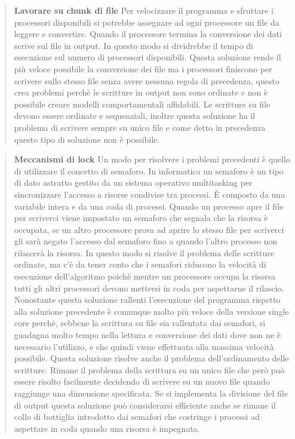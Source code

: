 \documentclass[../main.tex]{subfiles}
\begin{document}
\begin{verse}
\textbf{Lavorare su chunk di file}
Per velocizzare il programma e sfruttare i processori disponibili si potrebbe assegnare ad ogni processore un file da leggere e convertire. Quando il processore termina la conversione dei dati scrive sul file in output. In questo modo si dividrebbe il tempo di esecuzione sul numero di processori disponibili. 
Questa soluzione rende il più veloce possibile la conversione dei file ma i processori finiscono per scrivere sullo stesso file senza avere nessuna regola di precedenza, questo crea problemi perchè le scritture in output non sono ordinate e non è possibile creare modelli comportamentali affidabili. Le scritture su file devono essere ordinate e sequenziali, inoltre questa soluzione ha il problema di scrivere sempre su unico file e come detto in precedenza questo tipo di soluzione non è possibile.
\end{verse}

\begin{verse}
\textbf{Meccanismi di lock}
Un modo per risolvere i problemi precedenti è quello di utilizzare il concetto di semaforo. 
In informatica un semaforo è un tipo di dato astratto gestito da un sistema operativo multitasking per sincronizzare l'accesso a risorse condivise tra processi. È composto da una variabile intera e da una coda di processi. Quando un processo apre il file per scriverci viene impostato un semaforo che segnala che la risorsa è occupata, se un altro processore prova ad aprire lo stesso file per scriverci gli sarà negato l'accesso dal semaforo fino a quando l'altro processo non rilascerà la risorsa.
In questo modo si risolve il problema delle scritture ordinate, ma c'è da tener conto che i semafori riducono la velocità di esecuzione dell'algoritmo poichè mentre un processore occupa la risorsa tutti gli altri processori devono mettersi in coda per aspettarne il rilascio. Nonostante questa soluzione rallenti l'esecuzione del programma rispetto alla soluzione precedente è comunque molto più veloce della versione single core perchè, sebbene la scrittura su file sia rallentata dai semafori, si guadagna molto tempo nella lettura e conversione dei dati dove non ne è necessario l'utilizzo, e che quindi viene effettuata alla massima velocità possibile. Questa soluzione risolve anche il problema dell'ordinamento delle scritture.
Rimane il problema della scrittura su un unico file che però può essere risolto facilmente decidendo di scrivere su un nuovo file quando raggiunge una dimensione specificata.
Se si implementa la divisione del file di output questa soluzione può considerarsi efficiente anche se rimane il collo di bottiglia introdotto dai semafori che costringe i processi ad aspettare in coda quando una risorsa è impegnata.
\end{verse}
\end{document}
